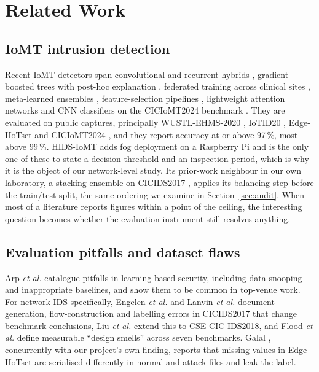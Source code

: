 \section{Related Work}\label{sec:related}

\subsection{IoMT intrusion detection}
\noindent Recent IoMT detectors span convolutional and recurrent hybrids \cite{berguiga2025,shaikh2024}, gradient-boosted trees with post-hoc explanation \cite{hosain2025}, federated training across clinical sites \cite{ghourabi2025}, meta-learned ensembles \cite{alalhareth2024}, feature-selection pipelines \cite{lazrek2024}, lightweight attention networks \cite{sogut2026} and CNN classifiers on the CICIoMT2024 benchmark \cite{mohammadi2024,dadkhah2024}. They are evaluated on public captures, principally WUSTL-EHMS-2020 \cite{wustl}, IoTID20 \cite{ullah2020}, Edge-IIoTset \cite{ferrag2022} and CICIoMT2024 \cite{dadkhah2024}, and they report accuracy at or above 97\,\%, most above 99\,\%. HIDS-IoMT \cite{berguiga2025} adds fog deployment on a Raspberry Pi and is the only one of these to state a decision threshold and an inspection period, which is why it is the object of our network-level study. Its prior-work neighbour in our own laboratory, a stacking ensemble on CICIDS2017 \cite{badiyani2026}, applies its balancing step before the train/test split, the same ordering we examine in Section~\ref{sec:audit}. When most of a literature reports figures within a point of the ceiling, the interesting question becomes whether the evaluation instrument still resolves anything.

\subsection{Evaluation pitfalls and dataset flaws}
\noindent Arp \textit{et al.} \cite{arp2022} catalogue pitfalls in learning-based security, including data snooping and inappropriate baselines, and show them to be common in top-venue work. For network IDS specifically, Engelen \textit{et al.} \cite{engelen2021} and Lanvin \textit{et al.} \cite{lanvin2023} document generation, flow-construction and labelling errors in CICIDS2017 that change benchmark conclusions, Liu \textit{et al.} \cite{liu2022} extend this to CSE-CIC-IDS2018, and Flood \textit{et al.} \cite{flood2024} define measurable ``design smells'' across seven benchmarks. Galal \cite{galal2026}, concurrently with our project's own finding, reports that missing values in Edge-IIoTset are serialised differently in normal and attack files and leak the label.

